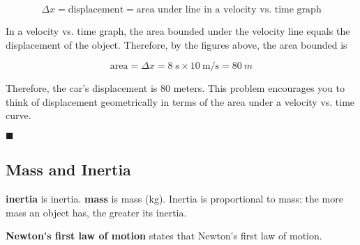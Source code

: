 \documentclass[dvipsnames]{article}
\begin{document}
\begin{equation*}
    \Delta x = \text{displacement} = \text{area under line in a velocity vs. time graph}
\end{equation*}

In a velocity vs. time graph, the area bounded under the velocity line equals the displacement of the object. Therefore, by the figures above, the area bounded is

\begin{equation*}
    \text{area} = \Delta x = \SI{8}{s} \times \SI[per-mode=fraction]{10}{\meter\per\second} = \boxed{\SI{80}{m}}
\end{equation*}

Therefore, the car's displacement is 80 meters. This problem encourages you to think of displacement geometrically in terms of the area under a velocity vs. time curve.

\hfill $\blacksquare$


\subsection{Mass and Inertia}

\textbf{\Gls{inertia}} is \glsdesc{inertia}. \textbf{\Gls{mass}} is \glsdesc{mass} (kg). Inertia is proportional to mass: the more mass an object has, the greater its inertia. 

\textbf{\gls{Newton's first law of motion}} states that \glsdesc{Newton's first law of motion}.


\end{document}
